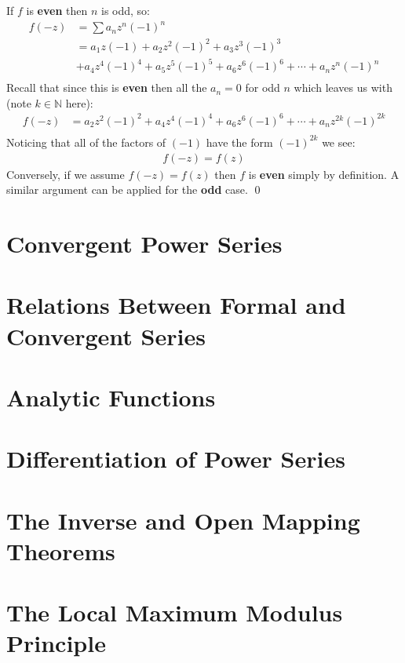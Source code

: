 \begin{enumerate}
  If $f$ is \textbf{even} then $n$ is odd, so:
  \begin{align*}
    f(-z) &= \sum a_n z^n (-1)^n \\
    &= a_1 z (-1) + a_2 z^2 (-1)^2 + a_3 z^3 (-1)^3 \\ 
    &+ a_4 z^4 (-1)^4 + a_5 z^5 (-1)^5 + a_6 z^6 (-1)^6 + \cdots + a_n z^n (-1)^n \\
  \end{align*}
  Recall that since this is \textbf{even} then all the $a_n = 0$ for odd $n$ which leaves us with (note $k \in \mathbb{N}$ here):
  \begin{align*}
    f(-z) &= a_2 z^2 (-1)^2 + a_4 z^4 (-1)^4 + a_6 z^6 (-1)^6 + \cdots + a_n z^{2k} (-1)^{2k} \\
  \end{align*} 
  Noticing that all of the factors of $(-1)$ have the form $(-1)^{2k}$ we see:
  \begin{align*}
    f(-z) = f(z)
  \end{align*}
  Conversely, if we assume $f(-z) = f(z)$ then $f$ is \textbf{even} simply by definition. A similar argument can be applied for the \textbf{odd} case.
  \qed
\end{enumerate}

\section{Convergent Power Series}
\section{Relations Between Formal and Convergent Series}
\section{Analytic Functions}
\section{Differentiation of Power Series}
\section{The Inverse and Open Mapping Theorems}
\section{The Local Maximum Modulus Principle}